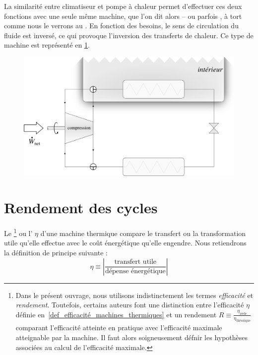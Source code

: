 			\clearfloats
			La similarité entre climatiseur et pompe à chaleur permet d’effectuer ces deux fonctions avec une seule même machine, que l’on dit alors  – ou parfois , à tort comme nous le verrons au \courssept. En fonction des besoins, le sens de circulation du fluide est inversé, ce qui provoque l’inversion des transferts de chaleur. Ce type de machine est représenté en \cref{fig_agencement_thermopompe_climatiseur_inversable}.
			
			\begin{figure}
				\begin{center}
					\includegraphics[width=\textwidth]{images/agencement_thermopompe_climatiseur_inversable.png}
				\end{center}
				\label{fig_agencement_thermopompe_climatiseur_inversable}
			\end{figure}


\section{Rendement des cycles}

	Le \footnote{Dans le présent ouvrage, nous utilisons indistinctement les termes \textit{efficacité} et \textit{rendement}. Toutefois, certains auteurs font une distinction entre l’efficacité $\eta$ définie en~\ref{def_efficacité_machines_thermiques} et un rendement $R \equiv \frac{\eta_\text{réele}}{\eta_\text{théorique}}$ comparant l’efficacité atteinte en pratique avec l’efficacité maximale atteignable par la machine. Il faut alors soigneusement défnir les hypothèses associées au calcul de l’efficacité maximale.}%
	 ou l’ $\eta$ d’une machine thermique compare le transfert ou la transformation utile qu’elle effectue avec le coût énergétique qu’elle engendre. Nous retiendrons la définition de principe suivante :
	\begin{equation}
		\eta \equiv \left| \frac{\text{transfert utile}}{\text{dépense énergétique}} \right|
		\label{def_efficacité_machines_thermiques}
	\end{equation}

